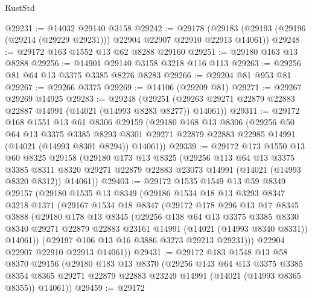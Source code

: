 \begin{lexlean}{RustStd}
\begin{coremodule}
@29231 := @14032 @29140 @3158
@29242 := @29178
    (@29183 (@29193 (@29196 (@29214 (@29229 @29231))) @22904 @22907 @22910 @22913 @14061))
@29248 := @29172 @163 @1552 @13 @62 @8288 @29160
@29251 := @29180 @163 @13 @8288
@29256 := @14901 @29140 @3158 @3218 @116 @113
@29263 := @29256 @81 @64 @13 @3375 @3385 @8276 @8283
@29266 := @29204 @81 @953 @81
@29267 := @29266 @3375
@29269 := @14106 (@29209 @81)
@29271 := @29267 @29269 @14925
@29283 := @29248
    (@29251 (@29263 @29271 @22879 @22883 @22887 @14991 (@14021 (@14993 @8283 @8277)) @14061))
@29311 := @29172
    @168
    @1551
    @13
    @61
    @8306
    @29159
    (@29180
      @168
      @13
      @8306
      (@29256
        @50
        @64
        @13
        @3375
        @3385
        @8293
        @8301
        @29271
        @22879
        @22883
        @22985
        @14991
        (@14021 (@14993 @8301 @8294))
        @14061))
@29339 := @29172
    @173
    @1550
    @13
    @60
    @8325
    @29158
    (@29180
      @173
      @13
      @8325
      (@29256
        @113
        @64
        @13
        @3375
        @3385
        @8311
        @8320
        @29271
        @22879
        @22883
        @23073
        @14991
        (@14021 (@14993 @8320 @8312))
        @14061))
@29403 := @29172
    @1535
    @1549
    @13
    @59
    @8349
    @29157
    (@29180
      @1535
      @13
      @8349
      (@29186
        @1534
        @18
        @13
        @3293
        @8347
        @3218
        @1371
        (@29167
          @1534
          @18
          @8347
          (@29172
            @178
            @296
            @13
            @17
            @8345
            @3888
            (@29180
              @178
              @13
              @8345
              (@29256
                @138
                @64
                @13
                @3375
                @3385
                @8330
                @8340
                @29271
                @22879
                @22883
                @23161
                @14991
                (@14021 (@14993 @8340 @8331))
                @14061))
            (@29197 @106 @13 @16 @3886 @3273 @29213 @29231)))
        @22904
        @22907
        @22910
        @22913
        @14061))
@29431 := @29172
    @183
    @1548
    @13
    @58
    @8370
    @29156
    (@29180
      @183
      @13
      @8370
      (@29256
        @143
        @64
        @13
        @3375
        @3385
        @8354
        @8365
        @29271
        @22879
        @22883
        @23249
        @14991
        (@14021 (@14993 @8365 @8355))
        @14061))
@29459 := @29172

\end{coremodule}
\end{lexlean}
